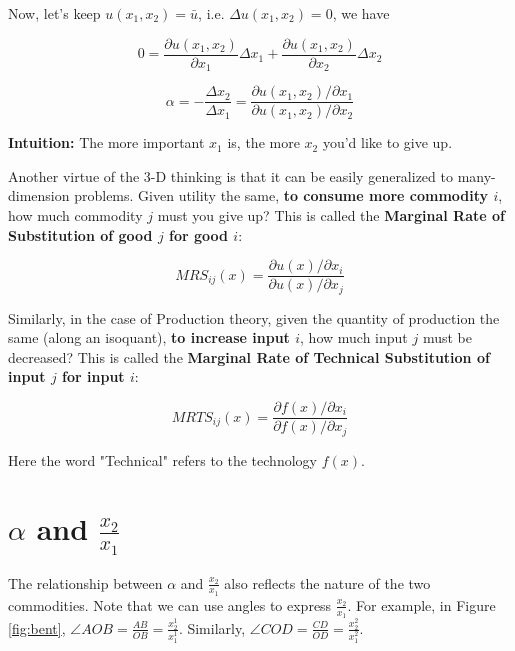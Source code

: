 \documentclass{article}
\begin{document}
\begin{mdframed}[backgroundcolor=blue!20,linecolor=white]
Now, let's keep $u(x_1,x_2) = \bar{u}$, i.e. $\Delta u(x_1,x_2) = 0$, we have

$$0 = \frac{\partial u(x_1,x_2)}{\partial x_1} \Delta x_1 + \frac{\partial u(x_1,x_2)}{\partial x_2} \Delta x_2$$


$$ \alpha = - \frac{\Delta x_2}{\Delta x_1} = \frac{\partial u(x_1,x_2) / \partial x_1}{\partial u(x_1,x_2) / \partial x_2}$$

\textbf{Intuition:} The more important $x_1$ is, the more $x_2$ you'd like to give up.

\vspace{2mm}


Another virtue of the 3-D thinking is that it can be easily generalized to many-dimension problems. Given utility the same, \textbf{to consume more commodity $i$}, how much commodity $j$ must you give up? This is called the \textbf{Marginal Rate of Substitution of good $j$ for good $i$}:

$$MRS_{ij}(x) = \frac{\partial u(x) / \partial x_i}{\partial u(x) / \partial x_j}$$

Similarly, in the case of Production theory, given the quantity of production the same (along an isoquant), \textbf{to increase input $i$}, how much input $j$ must be decreased? This is called the \textbf{Marginal Rate of Technical Substitution of input $j$ for input $i$}:

$$MRTS_{ij}(x) = \frac{\partial f(x) / \partial x_i}{\partial f(x) / \partial x_j}$$

Here the word "Technical" refers to the technology $f(x)$.

\section{$\alpha$ and $\frac{x_2}{x_1}$}


The relationship between $\alpha$ and $\frac{x_2}{x_1}$ also reflects the nature of the two commodities. Note that we can use angles to express $\frac{x_2}{x_1}$. For example, in Figure \ref{fig:bent}, $\angle AOB = \frac{AB}{OB} = \frac{x^1_2}{x^1_1}$. Similarly,  $\angle COD = \frac{CD}{OD} = \frac{x^2_2}{x^2_1}$.

\begin{center}
\end{center}
\end{mdframed}
\end{document}
